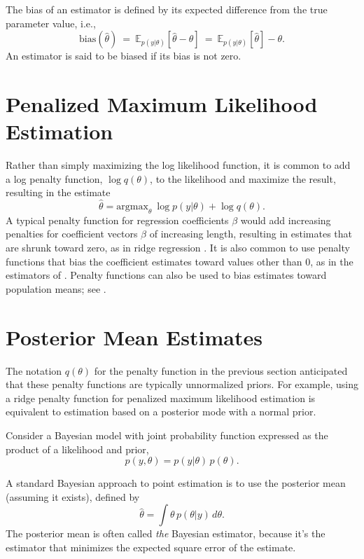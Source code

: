 The bias of an estimator is defined by its expected difference from
the true parameter value, i.e.,
\[
\mbox{bias}(\hat{\theta}) 
\ = \
\mathbb{E}_{p(y|\theta)}[\hat{\theta} - \theta]
\ = \
\mathbb{E}_{p(y|\theta)}[\hat{\theta}] - \theta.
\]
An estimator is said to be biased if its bias is not zero.



\section{Penalized Maximum Likelihood Estimation}

Rather than simply maximizing the log likelihood function, it is
common to add a log penalty function, $\log q(\theta)$,
to the likelihood and maximize the result, resulting in the estimate
%
\[
\hat{\theta} = \mbox{argmax}_{\theta} \ \log p(y|\theta) + \log
q(\theta).
\]
%
A typical penalty function for regression coefficients $\beta$ would
add increasing penalties for coefficient vectors $\beta$ of increasing
length, resulting in estimates that are shrunk toward zero, as in
ridge regression \citep{HoerlKennard:1970}.  It is also common to use
penalty functions that bias the coefficient estimates toward values
other than 0, as in the estimators of \cite{JamesStein:1961}.  Penalty
functions can also be used to bias estimates toward population means;
see \citep{EfronMorris:1975}.

\section{Posterior Mean Estimates}

The notation $q(\theta)$ for the penalty function in the previous
section anticipated that these penalty functions are typically
unnormalized priors.  For example, using a ridge penalty function for
penalized maximum likelihood estimation is equivalent to estimation
based on a posterior mode with a normal prior.

Consider a Bayesian model with joint probability function expressed as
the product of a likelihood and prior,
%
\[
p(y,\theta) = p(y|\theta) \, p(\theta).
\]
%

A standard Bayesian approach to point estimation is to use the
posterior mean (assuming it exists), defined by
%
\[
\hat{\theta} = \int \theta \, p(\theta|y) \, d\theta.
\]
%
The posterior mean is often called {\it the} Bayesian estimator,
because it's the estimator that minimizes the expected square error of
the estimate.


